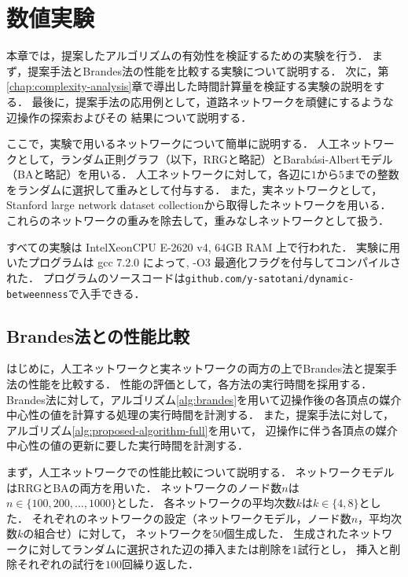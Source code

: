 \chapter{数値実験}
\label{chap:experiment}

本章では，提案したアルゴリズムの有効性を検証するための実験を行う．
まず，提案手法とBrandes法の性能を比較する実験について説明する．
次に，第\ref{chap:complexity-analysis}章で導出した時間計算量を検証する実験の説明をする．
最後に，提案手法の応用例として，道路ネットワークを頑健にするような辺操作の探索およびその
結果について説明する．

ここで，実験で用いるネットワークについて簡単に説明する．
人工ネットワークとして，ランダム正則グラフ（以下，RRGと略記）とBarab{\'{a}}si-Albertモデル（BAと略記）を用いる．
人工ネットワークに対して，各辺に$1$から$5$までの整数をランダムに選択して重みとして付与する．
また，実ネットワークとして，Stanford large network dataset collection\cite{Leskovec2016}から取得したネットワークを用いる．
これらのネットワークの重みを除去して，重みなしネットワークとして扱う．

すべての実験は Intel\textsuperscript\textregistered Xeon\textsuperscript\textregistered CPU E-2620 v4, 64GB RAM 上で行われた．
実験に用いたプログラムは gcc 7.2.0 によって, -O3 最適化フラグを付与してコンパイルされた．
プログラムのソースコードは\verb|github.com/y-satotani/dynamic-betweenness|で入手できる．

\section{Brandes法との性能比較}
はじめに，人工ネットワークと実ネットワークの両方の上でBrandes法と提案手法の性能を比較する．
性能の評価として，各方法の実行時間を採用する．
Brandes法に対して，アルゴリズム\ref{alg:brandes}を用いて辺操作後の各頂点の媒介中心性の値を計算する処理の実行時間を計測する．
また，提案手法に対して，アルゴリズム\ref{alg:proposed-algorithm-full}を用いて，
辺操作に伴う各頂点の媒介中心性の値の更新に要した実行時間を計測する．

まず，人工ネットワークでの性能比較について説明する．
ネットワークモデルはRRGとBAの両方を用いた．
ネットワークのノード数$n$は$n\in\{100,200,\ldots,1000\}$とした．
各ネットワークの平均次数$k$は$k\in\{4,8\}$とした．
それぞれのネットワークの設定（ネットワークモデル，ノード数$n$，平均次数$k$の組合せ）に対して，
ネットワークを$50$個生成した．
生成されたネットワークに対してランダムに選択された辺の挿入または削除を$1$試行とし，
挿入と削除それぞれの試行を$100$回繰り返した．

